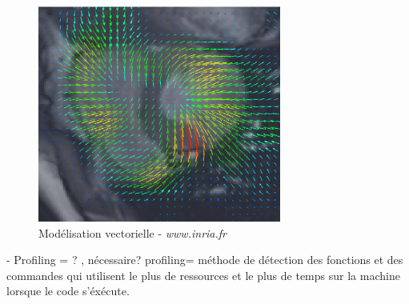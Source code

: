 \documentclass{report}
\begin{document}
\begin{figure}[h!]
	\begin{center}
		\includegraphics[width=8cm]{figures/field.eps}
	\end{center}	
	\caption{Modélisation vectorielle - \textit{www.inria.fr}}
	\label{Modélisation vectorielle}
\end{figure}

- Profiling = ? , nécessaire? profiling= méthode de détection des fonctions et des commandes qui utilisent le plus de ressources et le plus de temps sur la machine lorsque le code s'éxécute.



%	
%	
\end{document}
